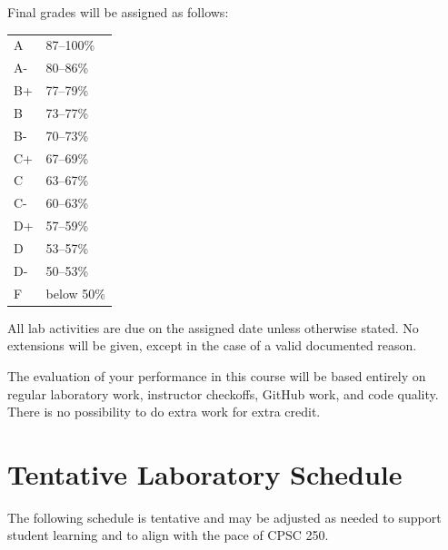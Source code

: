 \documentclass[11pt]{article}
\begin{document}
Final grades will be assigned as follows:

\begin{center}
\begin{tabular}{@{}ll@{}}
A & 87--100\% \\
A- & 80--86\% \\
B+ & 77--79\% \\
B & 73--77\% \\
B- & 70--73\% \\
C+ & 67--69\% \\
C & 63--67\% \\
C- & 60--63\% \\
D+ & 57--59\% \\
D & 53--57\% \\
D- & 50--53\% \\
F & below 50\% \\
\end{tabular}
\end{center}

All lab activities are due on the assigned date unless otherwise stated. No extensions will be given, except in the case of a valid documented reason.

The evaluation of your performance in this course will be based entirely on regular laboratory work, instructor checkoffs, GitHub work, and code quality. There is no possibility to do extra work for extra credit.

\section{Tentative Laboratory Schedule}

The following schedule is tentative and may be adjusted as needed to support student learning and to align with the pace of CPSC 250.
\end{document}
